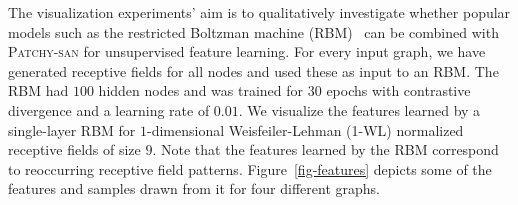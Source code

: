 \documentclass{article}
\begin{document}
The visualization experiments' aim is to qualitatively investigate whether popular models such as the restricted Boltzman machine (RBM)~\cite{freund:1992} can be combined with \textsc{Patchy-san} for unsupervised feature learning.  For every input graph, we have generated receptive fields for all nodes and used these as input  to an RBM.  The RBM had $100$ hidden nodes and was trained for $30$ epochs with contrastive divergence and a learning rate of $0.01$. We visualize the features learned by a single-layer RBM for $1$-dimensional Weisfeiler-Lehman (1-WL) normalized receptive fields of size $9$. Note that the features learned by the RBM correspond to reoccurring receptive field patterns. Figure~\ref{fig-features} depicts some of the features and samples drawn from it for four different graphs.
\end{document}
